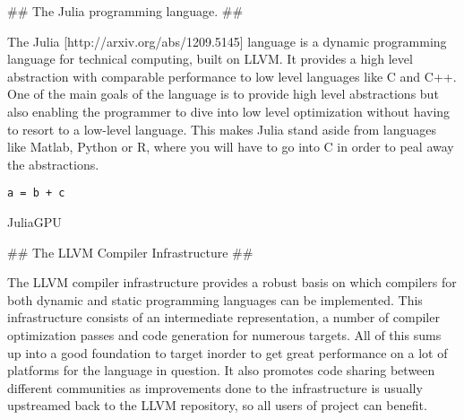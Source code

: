 \begin{markdown}
## The Julia programming language. ##

The Julia [http://arxiv.org/abs/1209.5145] language is a dynamic
programming language for technical computing, built on LLVM. It
provides a high level abstraction with comparable performance to low
level languages like C and C++. One of the main goals of the language
is to provide high level abstractions but also enabling the programmer
to dive into low level optimization without having to resort to a
low-level language. This makes Julia stand aside from languages like
Matlab, Python or R, where you will have to go into C in order to peal
away the abstractions. 

\begin{verbatim}
a = b + c
\end{verbatim}

JuliaGPU


## The LLVM Compiler Infrastructure ##

The LLVM compiler infrastructure provides a robust basis on which
compilers for both dynamic and static programming languages can be
implemented. This infrastructure consists of an intermediate
representation, a number of compiler optimization passes and code
generation for numerous targets. All of this sums up into a good
foundation to target inorder to get great performance on a lot of
platforms for the language in question. It also promotes code sharing
between different communities as improvements done to the
infrastructure is usually upstreamed back to the LLVM repository, so
all users of project can benefit.
\end{markdown}
